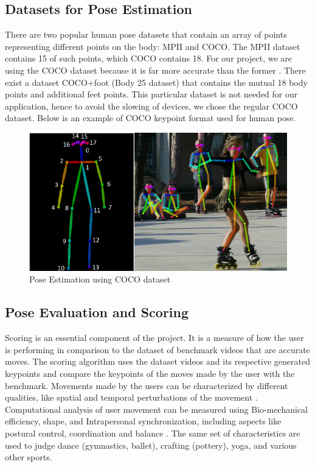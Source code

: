 \subsection{Datasets for Pose Estimation}
There are two popular human pose datasets that contain an array of points representing different points on the body: MPII and COCO. The MPII dataset contains 15 of such points, which COCO contains 18. For our project, we are using the COCO dataset because it is far more accurate than the former \cite{wholebodyPoseEst}. There exist a dataset COCO+foot (Body 25 dataset) that contains the mutual 18 body points and additional feet points. This particular dataset is not needed for our application, hence to avoid the slowing of devices, we chose the regular COCO dataset. Below is an example of COCO keypoint format used for human pose.

\begin{figure}
\centering 
\includegraphics[scale=0.5]{images/COCO.png}
\caption{Pose Estimation using COCO dataset}
\end{figure}

\subsection{Pose Evaluation and Scoring}
Scoring is an essential component of the project. It is a measure of how the user is performing in comparison to the dataset of benchmark videos that are accurate moves. The scoring algorithm uses the dataset videos and its respective generated keypoints and compare the keypoints of the moves made by the user with the benchmark. Movements made by the users can be characterized by different qualities, like spatial and temporal perturbations of the movement \cite{movementQuality}. Computational analysis of user movement can be measured using Bio-mechanical efficiency, shape, and Intrapersonal synchronization, including aspects like postural control, coordination and balance \cite{movementQuality}. The same set of characteristics are used to judge dance (gymnastics, ballet), crafting (pottery), yoga, and various other sports. 


